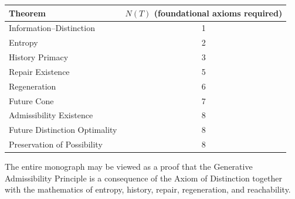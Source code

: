 \documentclass[12pt,twoside,openright]{book}
\begin{document}
\begin{center}
\begin{tabular}{lc}
\toprule
Theorem & $N(T)$ (foundational axioms required) \\
\midrule
Information--Distinction & 1 \\
Entropy & 2 \\
History Primacy & 3 \\
Repair Existence & 5 \\
Regeneration & 6 \\
Future Cone & 7 \\
Admissibility Existence & 8 \\
Future Distinction Optimality & 8 \\
Preservation of Possibility & 8 \\
\bottomrule
\end{tabular}
\end{center}

The entire monograph may be viewed as a proof that the
Generative Admissibility Principle is a consequence of
the Axiom of Distinction together with the mathematics
of entropy, history, repair, regeneration, and
reachability.

\printglossaries

\printbibliography[heading=bibintoc,title={References}]


%

\printindex
\end{document}
